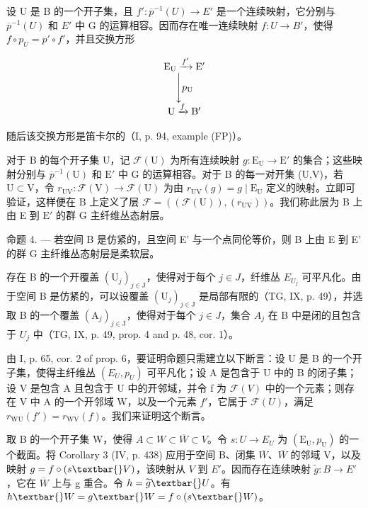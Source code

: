 设 U 是 B 的一个开子集，且 \(f'\colon \overline{p}^{-1}(U) \to E'\) 是一个连续映射，它分别与 \(\overline{p}^{-1}(U)\) 和 \(E'\) 中 G 的运算相容。因而存在唯一连续映射 \(f\colon U \to B'\)，使得 \(f \circ p_{U} = p' \circ f'\)，并且交换方形

\[
\begin{array}{c} \mathrm {E_ {U}} \xrightarrow {f ^ {\prime}} \mathrm {E^ {\prime}} \\ \Biggl \downarrow p _ {\mathrm{U}} \\ \mathrm{U} \xrightarrow {f} \mathrm {B^ {\prime}} \end{array}
\]

随后该交换方形是笛卡尔的（I, p. 94, example (FP)）。

对于 B 的每个开子集 U，记 \(\mathcal{F}(\mathrm{U})\) 为所有连续映射 \(g\colon \mathrm{E}_{\mathrm{U}}\to \mathrm{E}'\) 的集合；这些映射分别与 \(\overline{p}^{-1}(\mathrm{U})\) 和 \(\mathrm{E}'\) 中 G 的运算相容。对于 B 的每一对开集 (U,V)，若 \(\mathrm{U}\subset \mathrm{V}\)，令 \(r_{\mathrm{UV}}\colon \mathcal{F}(\mathrm{V})\to \mathcal{F}(\mathrm{U})\) 为由 \(r_{\mathrm{UV}}(g) = g\mid \mathrm{E}_{\mathrm{U}}\) 定义的映射。立即可验证，这样便在 B 上定义了层 \(\mathcal{F} = ((\mathcal{F}(\mathrm{U})),(r_{\mathrm{UV}}))\)。我们称此层为 B 上由 E 到 \(\mathrm{E}'\) 的群 G 主纤维丛态射层。

命题 4. --- 若空间 B 是仿紧的，且空间 E' 与一个点同伦等价，则 B 上由 E 到 E' 的群 G 主纤维丛态射层是柔软层。

存在 B 的一个开覆盖 \((\mathrm{U}_{j})_{j\in\mathrm{J}}\)，使得对于每个 \(j\in J\)，纤维丛 \(E_{U_{j}}\) 可平凡化。由于空间 B 是仿紧的，可以设覆盖 \((\mathrm{U}_{j})_{j\in\mathrm{J}}\) 是局部有限的（TG, IX, p. 49），并选取 B 的一个覆盖 \((\mathrm{A}_{j})_{j\in\mathrm{J}}\)，使得对于每个 \(j\in J\)，集合 \(A_{j}\) 在 B 中是闭的且包含于 \(U_{j}\) 中（TG, IX, p. 49, prop. 4 and p. 48, cor. 1）。

由 I, p. 65, cor. 2 of prop. 6，要证明命题只需建立以下断言：设 U 是 B 的一个开子集，使得主纤维丛 \((E_{U}, p_{U})\) 可平凡化；设 A 是包含于 U 中的 B 的闭子集；设 V 是包含 A 且包含于 U 中的开邻域，并令 f 为 \(\mathcal{F}(V)\) 中的一个元素；则存在 V 中 A 的一个开邻域 W，以及一个元素 \(f'\)，它属于 \(\mathcal{F}(U)\)，满足 \(r_{\mathrm{WU}}(f') = r_{\mathrm{WV}}(f)\)。我们来证明这个断言。

取 B 的一个开子集 W，使得 \(A \subset W \subset \overline{W} \subset V\)。令 \(s: U \to E_{U}\) 为 \((\mathrm{E}_{\mathrm{U}}, p_{\mathrm{U}})\) 的一个截面。将 Corollary 3 (IV, p. 438) 应用于空间 B、闭集 \(\overline{W}\)、\(\overline{W}\) 的邻域 V，以及映射 \(g = f \circ (s\textbar{} V)\)，该映射从 \(V\) 到 \(E'\)。因而存在连续映射 \(\widetilde{g}: B \to E'\)，它在 \(\overline{W}\) 上与 g 重合。令 \(h = \widetilde{g}\textbar{} U\)。有 \(h\textbar{} W = g\textbar{} W = f \circ (s\textbar{} W)\)。

